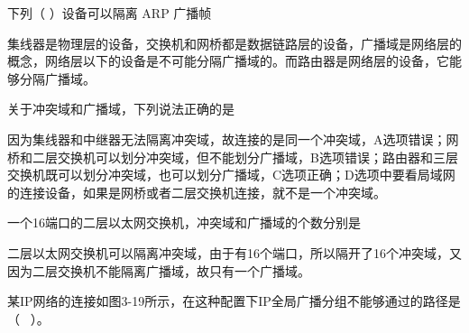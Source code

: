 \question 下列（ ）设备可以隔离 ARP 广播帧
\par{}
\begin{solution}集线器是物理层的设备，交换机和网桥都是数据链路层的设备，广播域是网络层的概念，网络层以下的设备是不可能分隔广播域的。而路由器是网络层的设备，它能够分隔广播域。
\end{solution}
\question 关于冲突域和广播域，下列说法正确的是
\par{}
\begin{solution}因为集线器和中继器无法隔离冲突域，故连接的是同一个冲突域，A选项错误；网桥和二层交换机可以划分冲突域，但不能划分广播域，B选项错误；路由器和三层交换机既可以划分冲突域，也可以划分广播域，C选项正确；D选项中要看局域网的连接设备，如果是网桥或者二层交换机连接，就不是一个冲突域。
\end{solution}
\question 一个16端口的二层以太网交换机，冲突域和广播域的个数分别是
\par{}
\begin{solution}二层以太网交换机可以隔离冲突域，由于有16个端口，所以隔开了16个冲突域，又因为二层交换机不能隔离广播域，故只有一个广播域。
\end{solution}
\question 某IP网络的连接如图3-19所示，在这种配置下IP全局广播分组不能够通过的路径是（
~）。

